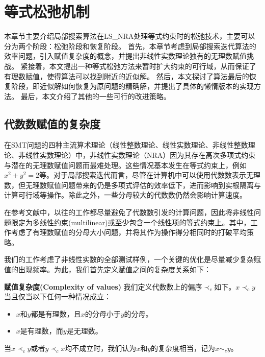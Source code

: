 \chapter{等式松弛机制}\label{chap:method2}

本章节主要介绍局部搜索算法在LS\_NRA处理等式约束时的松弛技术，主要可以分为两个阶段：松弛阶段和恢复阶段。
首先，本章节考虑到局部搜索迭代算法的效率问题，引入赋值复杂度的概念，并提出非线性实数理论独有的无理数赋值挑战。
紧接着，本文提出一种等式松弛方法来暂时扩大约束的可行域，从而保证了有理数赋值，使得算法可以找到附近的近似解。
然后，本文探讨了算法最后的恢复阶段，即近似解如何恢复为原问题的精确解，并提出了具体的懒惰版本的实现方法。
最后，本文介绍了其他的一些可行的改进策略。

\section{代数数赋值的复杂度}
在SMT问题的四种主流算术理论（线性整数理论、线性实数理论、非线性整数理论、非线性实数理论）中，非线性实数理论（NRA）因为其存在高次多项式约束与潜在的无理数赋值问题而最难处理。这些情况基本发生在等式约束上，例如$x^2 + y^2 = 2$等。对于局部搜索迭代而言，尽管在计算机中可以使用代数数表示无理数，但无理数赋值问题带来的仍是多项式评估的效率低下，进而影响到实根隔离与计算可行域等操作。除此之外，一些分母较大的代数数仍然会影响计算速度。

在参考文献\cite{multilinear,LiXZ23}中，以往的工作都尽量避免了代数数引发的计算问题，因此将非线性问题限定为多线性约束(multilinear)或至少包含一个线性项的等式约束上。其中，工作\cite{multilinear}考虑了有理数赋值的分母大小问题，并将其作为操作得分相同时的打破平均策略。

我们的工作考虑了非线性实数的全部测试样例，一个关键的优化是尽量减少复杂赋值的出现频率。为此，我们首先定义赋值之间的复杂度关系如下：

\begin{definition}{\textbf{赋值复杂度(Complexity of values)}}
\label{def:complexity}
我们定义代数数上的偏序$\prec_c$如下。$x \prec_c y$当且仅当以下任何一种情况成立：

\begin{itemize}
    \item $x$和$y$都是有理数，且$x$的分母小于$y$的分母。
    \item $x$是有理数，而$y$是无理数。
\end{itemize}
当$x \prec_c y$或者$y \prec_c x$均不成立时，我们认为$x$和$y$的复杂度相当，记为$x \sim_c y$。
\end{definition}

